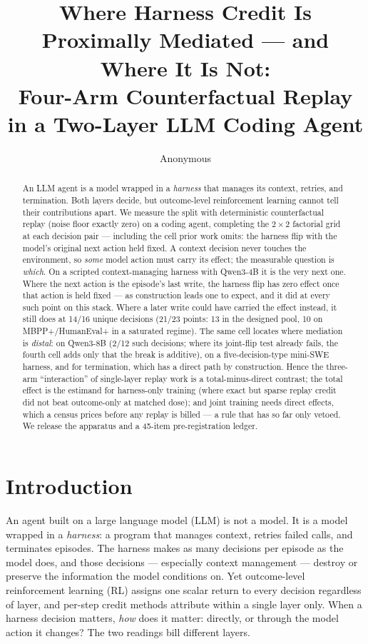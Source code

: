 \documentclass{article}
\title{Where Harness Credit Is Proximally Mediated --- and Where It Is Not:\\
Four-Arm Counterfactual Replay in a Two-Layer LLM Coding Agent}
\author{Anonymous}
\theoremstyle{remark}
\begin{document}
\maketitle

\begin{abstract}
An LLM agent is a model wrapped in a \emph{harness} that manages its
context, retries, and termination. Both layers decide, but outcome-level
reinforcement learning cannot tell their contributions apart. We measure
the split with deterministic counterfactual replay (noise floor exactly
zero) on a coding agent, completing the $2\times 2$ factorial grid at
each decision pair --- including the cell prior work omits: the harness
flip with the model's original next action held fixed. A context decision
never touches the environment, so \emph{some} model action must carry its
effect; the measurable question is \emph{which}. On a scripted
context-managing harness with Qwen3-4B it is the very next one. Where
the next action is the episode's last write, the harness flip has zero
effect once that action is held fixed --- as construction leads one to
expect, and it did at every such point on this stack. Where a later
write could have carried the effect instead, it still does at 14/16
unique decisions (21/23 points: 13 in the designed pool, 10 on
MBPP+/HumanEval+ in a saturated regime). The same cell locates where
mediation is \emph{distal}: on Qwen3-8B (2/12 such decisions; where its
joint-flip test already fails, the fourth cell adds only that the break
is additive), on a five-decision-type mini-SWE harness, and for
termination, which has a direct path by construction. Hence the
three-arm ``interaction'' of single-layer replay work is a
total-minus-direct contrast; the total effect is the estimand for
harness-only training (where exact but sparse replay credit did not beat
outcome-only at matched dose); and joint training needs direct effects,
which a census prices before any replay is billed --- a rule that has so
far only vetoed. We release the apparatus and a 45-item
pre-registration ledger.
\end{abstract}

\section{Introduction}
An agent built on a large language model (LLM) is not a model. It is a
model wrapped in a \emph{harness}: a program that manages context,
retries failed calls, and terminates episodes. The harness makes as many
decisions per episode as the model does, and those decisions ---
especially context management --- destroy or preserve the information the
model conditions on. Yet outcome-level reinforcement learning (RL) assigns
one scalar return to every decision regardless of layer, and per-step
credit methods attribute within a single layer only. When a harness
decision matters, \emph{how} does it matter: directly, or through the
model action it changes? The two readings bill different layers.
\end{document}
